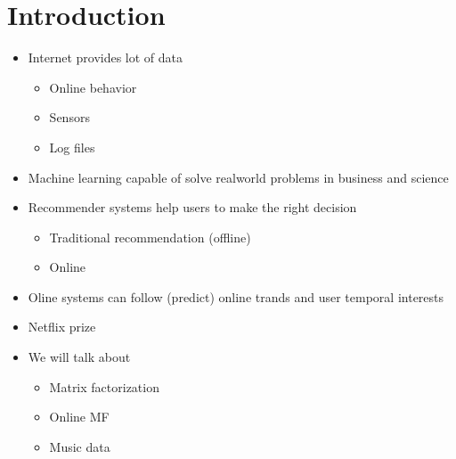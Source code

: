 \chapter{Introduction}
\begin{itemize}
\item{ Internet provides lot of data }
  \begin{itemize}
  \item Online behavior
  \item Sensors
  \item Log files 
  \end{itemize}
\item Machine learning capable of solve realworld problems in business and science
\item Recommender systems help users to make the right decision
  \begin{itemize}
  \item Traditional recommendation (offline)
  \item Online 
  \end{itemize}
\item Oline systems can follow (predict) online trands and user temporal interests
\item Netflix prize
\item We will talk about
  \begin{itemize}
  \item Matrix factorization
  \item Online MF
  \item Music data 
  \end{itemize}
\end{itemize}
